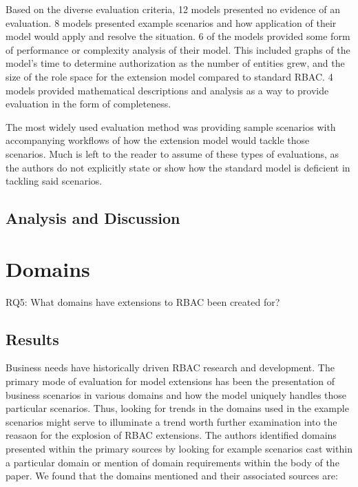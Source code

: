 Based on the diverse evaluation criteria, 12 models presented no evidence of an evaluation.  8 models presented example scenarios
and how application of their model would apply and resolve the situation.  6 of the models provided some form of performance
or complexity analysis of their model.  This included graphs of the model's time to determine authorization as the number of entities
grew, and the size of the role space for the extension model compared to standard RBAC. 4 models provided mathematical descriptions
and analysis as a way to provide evaluation in the form of completeness.

The most widely used evaluation method was providing sample scenarios with accompanying workflows of how the extension model
would tackle those scenarios.  Much is left to the reader to assume of these types of evaluations, as the authors do not explicitly state
or show how the standard model is deficient in tackling said scenarios.

\subsection{Analysis and Discussion}


\section{Domains} \label{sec:domains}

RQ5: What domains have extensions to RBAC been created for?

\subsection{Results}

Business needs have historically driven RBAC research and development.  The primary mode of evaluation for
model extensions has been the presentation of business scenarios in various domains and how the model
uniquely handles those particular scenarios.  Thus, looking for trends in the domains used in the example
scenarios might serve to illuminate a trend worth further examination into the reasaon for the explosion of
RBAC extensions.  The authors identified domains presented within the primary sources by looking for example
scenarios cast within a particular domain or mention of domain requirements within the body of the paper.
We found that the domains mentioned and their associated sources are:

